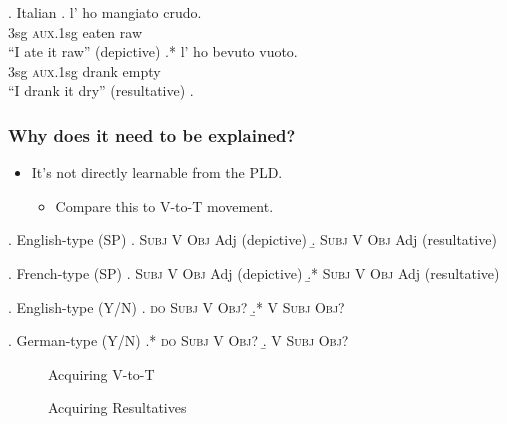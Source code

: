 \documentclass{beamer}
\begin{document}
\begin{frame}
\begin{overprint}
    \ex. Italian
    \ag. l' ho mangiato crudo.\\
    3sg \textsc{aux}.1sg eaten raw\\
    ``I ate it raw'' (depictive)
    \bg.* l' ho bevuto vuoto.\\
    3sg \textsc{aux}.1sg drank empty\\
    ``I drank it dry'' (resultative)
    \z.

  \end{overprint}
\end{frame}
\begin{frame}
  \frametitle{Why does it need to be explained?}
  \begin{itemize}
    \item It's not directly learnable from the PLD.
      \begin{itemize}
	\item<3-> Compare this to V-to-T movement.
      \end{itemize}
  \end{itemize}
  \begin{overprint}
    \ex. English-type (SP)
    \a. \textsc{Subj} V \textsc{Obj} Adj (depictive)
    \b. \textsc{Subj} V \textsc{Obj} Adj (resultative)

    \ex. French-type (SP)
    \a. \textsc{Subj} V \textsc{Obj} Adj (depictive)
    \b.* \textsc{Subj} V \textsc{Obj} Adj (resultative)

    \ex. English-type (Y/N)
    \a. \textsc{do Subj} V \textsc{Obj}? 
    \b.* V \textsc{Subj} \textsc{Obj}?

    \ex. German-type (Y/N)
    \a.* \textsc{do Subj} V \textsc{Obj}? 
    \b. V \textsc{Subj} \textsc{Obj}?

    \begin{figure}[h]
      \centering
      \caption{Acquiring V-to-T}
      \label{fig:VtoTAcq}
    \end{figure}
    \begin{figure}[h]
      \centering
      \caption{Acquiring Resultatives}
      \label{fig:resAcq}
    \end{figure}
  \end{overprint}
\end{frame}
\end{document}
